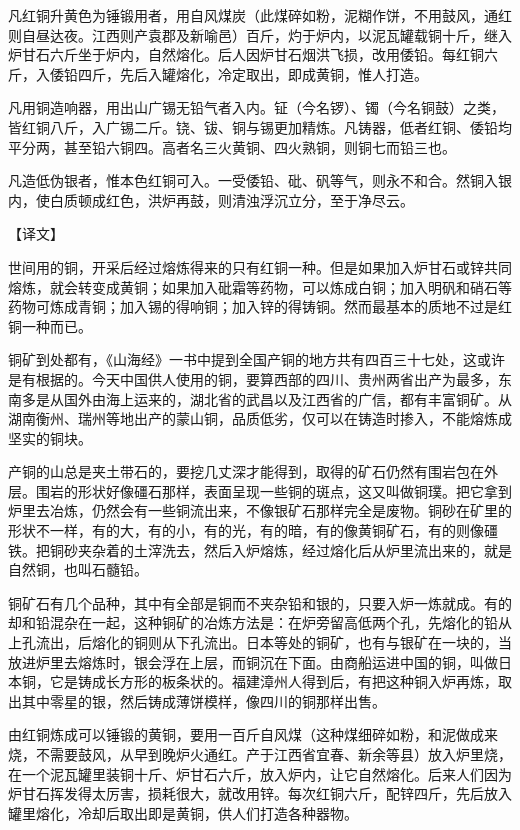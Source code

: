 \documentclass[12pt,UTF8]{ctexbook}
\begin{document}
凡红铜升黄色为锤锻用者，用自风煤炭（此煤碎如粉，泥糊作饼，不用鼓风，通红则自昼达夜。江西则产袁郡及新喻邑）百斤，灼于炉内，以泥瓦罐载铜十斤，继入炉甘石六斤坐于炉内，自然熔化。后人因炉甘石烟洪飞损，改用倭铅。每红铜六斤，入倭铅四斤，先后入罐熔化，冷定取出，即成黄铜，惟人打造。

凡用铜造响器，用出山广锡无铅气者入内。钲（今名锣）、镯（今名铜鼓）之类，皆红铜八斤，入广锡二斤。铙、钹、铜与锡更加精炼。凡铸器，低者红铜、倭铅均平分两，甚至铅六铜四。高者名三火黄铜、四火熟铜，则铜七而铅三也。

凡造低伪银者，惟本色红铜可入。一受倭铅、砒、矾等气，则永不和合。然铜入银内，使白质顿成红色，洪炉再鼓，则清浊浮沉立分，至于净尽云。

【译文】

世间用的铜，开采后经过熔炼得来的只有红铜一种。但是如果加入炉甘石或锌共同熔炼，就会转变成黄铜；如果加入砒霜等药物，可以炼成白铜；加入明矾和硝石等药物可炼成青铜；加入锡的得响铜；加入锌的得铸铜。然而最基本的质地不过是红铜一种而已。

铜矿到处都有，《山海经》一书中提到全国产铜的地方共有四百三十七处，这或许是有根据的。今天中国供人使用的铜，要算西部的四川、贵州两省出产为最多，东南多是从国外由海上运来的，湖北省的武昌以及江西省的广信，都有丰富铜矿。从湖南衡州、瑞州等地出产的蒙山铜，品质低劣，仅可以在铸造时掺入，不能熔炼成坚实的铜块。

产铜的山总是夹土带石的，要挖几丈深才能得到，取得的矿石仍然有围岩包在外层。围岩的形状好像礓石那样，表面呈现一些铜的斑点，这又叫做铜璞。把它拿到炉里去冶炼，仍然会有一些铜流出来，不像银矿石那样完全是废物。铜砂在矿里的形状不一样，有的大，有的小，有的光，有的暗，有的像黄铜矿石，有的则像礓铁。把铜砂夹杂着的土滓洗去，然后入炉熔炼，经过熔化后从炉里流出来的，就是自然铜，也叫石髓铅。

铜矿石有几个品种，其中有全部是铜而不夹杂铅和银的，只要入炉一炼就成。有的却和铅混杂在一起，这种铜矿的冶炼方法是：在炉旁留高低两个孔，先熔化的铅从上孔流出，后熔化的铜则从下孔流出。日本等处的铜矿，也有与银矿在一块的，当放进炉里去熔炼时，银会浮在上层，而铜沉在下面。由商船运进中国的铜，叫做日本铜，它是铸成长方形的板条状的。福建漳州人得到后，有把这种铜入炉再炼，取出其中零星的银，然后铸成薄饼模样，像四川的铜那样出售。

由红铜炼成可以锤锻的黄铜，要用一百斤自风煤（这种煤细碎如粉，和泥做成来烧，不需要鼓风，从早到晚炉火通红。产于江西省宜春、新余等县）放入炉里烧，在一个泥瓦罐里装铜十斤、炉甘石六斤，放入炉内，让它自然熔化。后来人们因为炉甘石挥发得太厉害，损耗很大，就改用锌。每次红铜六斤，配锌四斤，先后放入罐里熔化，冷却后取出即是黄铜，供人们打造各种器物。
\end{document}

